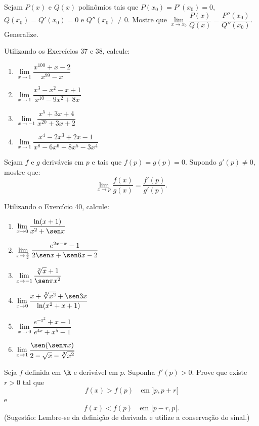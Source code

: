 \begin{exercicio}[38]
Sejam $P(x)$ e $Q(x)$ polinômios tais que $P(x_0) = P'(x_0) = 0$, $Q(x_0) = Q'(x_0) = 0$ e $Q''(x_0) \neq 0$. Mostre que $\lim\limits_{x \to x_0} \dfrac{P(x)}{Q(x)} = \dfrac{P''(x_0)}{Q''(x_0)}$. Generalize.
\end{exercicio}

\begin{exercicio}[39]
Utilizando os Exercícios 37 e 38, calcule:
\begin{enumerate}[label=\alph*)]
    \item $\lim\limits_{x \to 1} \dfrac{x^{100} + x - 2}{x^{99} - x}$
    \item $\lim\limits_{x \to 1} \dfrac{x^3 - x^2 - x + 1}{x^{10} - 9x^2 + 8x}$
    \item $\lim\limits_{x \to -1} \dfrac{x^5 + 3x + 4}{x^{20} + 3x + 2}$
    \item $\lim\limits_{x \to 1} \dfrac{x^4 - 2x^3 + 2x - 1}{x^8 - 6x^6 + 8x^5 - 3x^4}$
\end{enumerate}
\end{exercicio}

\begin{exercicio}[40]
Sejam $f$ e $g$ deriváveis em $p$ e tais que $f(p) = g(p) = 0$. Supondo $g'(p) \neq 0$, mostre que:
\[
\lim_{x \to p} \dfrac{f(x)}{g(x)} = \dfrac{f'(p)}{g'(p)}.
\]
\end{exercicio}

\begin{exercicio}[41]
Utilizando o Exercício 40, calcule:
\begin{enumerate}[label=\alph*)]
    \item $\lim\limits_{x \to 0} \dfrac{\ln(x + 1)}{x^2 + \sen x}$
    \item $\lim\limits_{x \to \frac{\pi}{2}} \dfrac{e^{2x - \pi} - 1}{2\sen x + \sen 6x - 2}$
    \item $\lim\limits_{x \to -1} \dfrac{\sqrt[3]{x} + 1}{\sen\pi x^2}$
    \item $\lim\limits_{x \to 0} \dfrac{x + \sqrt[3]{x^2} + \sen 3x}{\ln(x^2 + x + 1)}$
    \item $\lim\limits_{x \to 0} \dfrac{e^{-x^2} + x - 1}{e^{4x} + x^5 - 1}$
    \item $\lim\limits_{x \to 1} \dfrac{\sen(\sen\pi x)}{2 - \sqrt{x} - \sqrt[3]{x^2}}$
\end{enumerate}
\end{exercicio}

\begin{exercicio}[42]
Seja $f$ definida em $\R$ e derivável em $p$. Suponha $f'(p) > 0$. Prove que existe $r > 0$ tal que
\[
f(x) > f(p) \quad \text{em } {]p, p + r[}
\]
e
\[
f(x) < f(p) \quad \text{em } {]p - r, p[}.
\]
(Sugestão: Lembre-se da definição de derivada e utilize a conservação do sinal.)
\end{exercicio}

